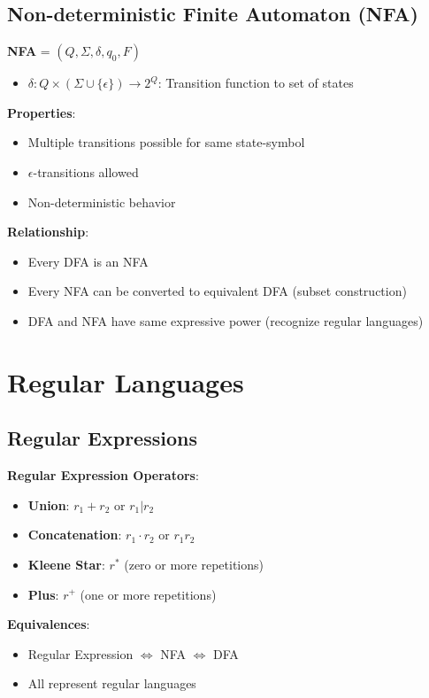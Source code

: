\documentclass[12pt,a4paper]{report}
\begin{document}
\subsection{Non-deterministic Finite Automaton (NFA)}
\begin{concept}
\textbf{NFA} = $(Q, \Sigma, \delta, q_0, F)$
\begin{itemize}
    \item $\delta: Q \times (\Sigma \cup \{\epsilon\}) \to 2^Q$: Transition function to set of states
\end{itemize}

\textbf{Properties}:
\begin{itemize}
    \item Multiple transitions possible for same state-symbol
    \item $\epsilon$-transitions allowed
    \item Non-deterministic behavior
\end{itemize}

\textbf{Relationship}:
\begin{itemize}
    \item Every DFA is an NFA
    \item Every NFA can be converted to equivalent DFA (subset construction)
    \item DFA and NFA have same expressive power (recognize regular languages)
\end{itemize}
\end{concept}

\section{Regular Languages}

\subsection{Regular Expressions}
\begin{concept}
\textbf{Regular Expression Operators}:
\begin{itemize}
    \item \textbf{Union}: $r_1 + r_2$ or $r_1 | r_2$
    \item \textbf{Concatenation}: $r_1 \cdot r_2$ or $r_1 r_2$
    \item \textbf{Kleene Star}: $r^*$ (zero or more repetitions)
    \item \textbf{Plus}: $r^+$ (one or more repetitions)
\end{itemize}

\textbf{Equivalences}:
\begin{itemize}
    \item Regular Expression $\Leftrightarrow$ NFA $\Leftrightarrow$ DFA
    \item All represent regular languages
\end{itemize}
\end{concept}
\end{document}
